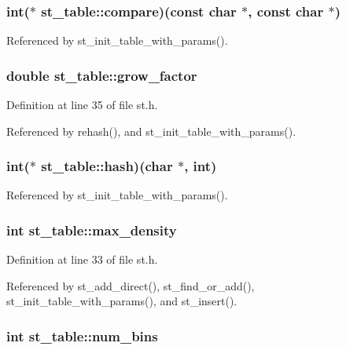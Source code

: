 \subsubsection{\setlength{\rightskip}{0pt plus 5cm}int($\ast$ \bf{st\_\-table::compare})(const char $\ast$, const char $\ast$)}\label{structst__table_394841ca8970d22eb7f647f955fb766b}




Referenced by st\_\-init\_\-table\_\-with\_\-params().
\subsubsection{\setlength{\rightskip}{0pt plus 5cm}double \bf{st\_\-table::grow\_\-factor}}\label{structst__table_33a7ea1dabc05f109a41d076fc835b02}




Definition at line 35 of file st.h.

Referenced by rehash(), and st\_\-init\_\-table\_\-with\_\-params().
\subsubsection{\setlength{\rightskip}{0pt plus 5cm}int($\ast$ \bf{st\_\-table::hash})(char $\ast$, int)}\label{structst__table_10d9b63bd656192bb28618dbaa3ee8bf}




Referenced by st\_\-init\_\-table\_\-with\_\-params().
\subsubsection{\setlength{\rightskip}{0pt plus 5cm}int \bf{st\_\-table::max\_\-density}}\label{structst__table_0f854eb16ba72f1a8cd89a3974ceac6d}




Definition at line 33 of file st.h.

Referenced by st\_\-add\_\-direct(), st\_\-find\_\-or\_\-add(), st\_\-init\_\-table\_\-with\_\-params(), and st\_\-insert().
\subsubsection{\setlength{\rightskip}{0pt plus 5cm}int \bf{st\_\-table::num\_\-bins}}\label{structst__table_82a6c5cde11a832171b4c3e8fec57c36}




